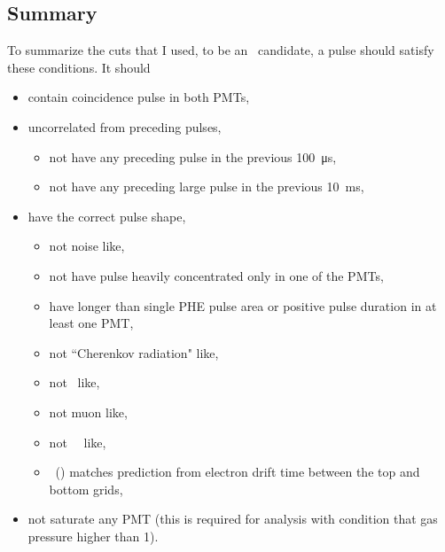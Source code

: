 \subsection{Summary}
To summarize the cuts that I used, to be an \ees\ candidate, a pulse should satisfy these conditions. It should
\begin{itemize}
\item contain coincidence pulse in both PMTs,
\item uncorrelated from preceding pulses,
 \begin{itemize}
 \item not have any preceding pulse in the previous \SI{100}{\us},
 \item not have any preceding large pulse in the previous \SI{10}{\ms},
 \end{itemize}
\item have the correct pulse shape, 
 \begin{itemize}
 	 \item not noise like,
 	 \item not have pulse heavily concentrated only in one of the PMTs,
 \item have longer than single PHE pulse area or positive pulse duration in at least one PMT,
 \item not ``Cherenkov radiation" like, 
 \item not \sone\ like,
 \item not muon like,
 \item not \sone\ \stwo\ like,

 \item \ttenninety\ (\rpd ) matches prediction from electron drift time between the top and bottom grids, 
 \end{itemize}
\item not saturate any PMT (this is required for analysis with condition that gas pressure higher than \SI{1}{\bara}).
\end{itemize}


